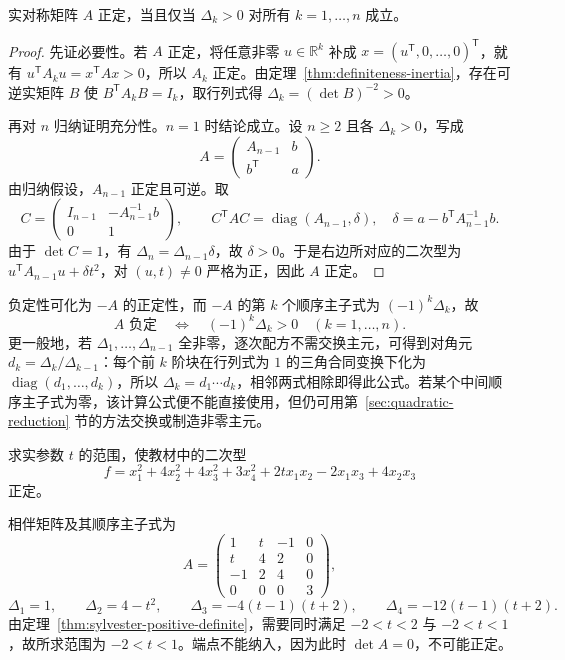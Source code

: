 \begin{theorem}[Sylvester 判据]
\label{thm:sylvester-positive-definite}
实对称矩阵 $A$ 正定，当且仅当 $\Delta_k>0$ 对所有 $k=1,\ldots,n$ 成立。
\end{theorem}
\begin{proof}
先证必要性。若 $A$ 正定，将任意非零 $u\in\mathbb R^k$ 补成 $x=(u^{\mathsf T},0,\ldots,0)^{\mathsf T}$，就有 $u^{\mathsf T}A_ku=x^{\mathsf T}Ax>0$，所以 $A_k$ 正定。由定理~\ref{thm:definiteness-inertia}，存在可逆实矩阵 $B$ 使 $B^{\mathsf T}A_kB=I_k$，取行列式得 $\Delta_k=(\det B)^{-2}>0$。

再对 $n$ 归纳证明充分性。$n=1$ 时结论成立。设 $n\geq2$ 且各 $\Delta_k>0$，写成
\[
    A=\begin{pmatrix}A_{n-1}&b\\b^{\mathsf T}&a\end{pmatrix}.
\]
由归纳假设，$A_{n-1}$ 正定且可逆。取
\[
    C=\begin{pmatrix}I_{n-1}&-A_{n-1}^{-1}b\\0&1\end{pmatrix},
    \qquad
    C^{\mathsf T}AC
     =\operatorname{diag}(A_{n-1},\delta),
    \quad \delta=a-b^{\mathsf T}A_{n-1}^{-1}b.
\]
由于 $\det C=1$，有 $\Delta_n=\Delta_{n-1}\delta$，故 $\delta>0$。于是右边所对应的二次型为 $u^{\mathsf T}A_{n-1}u+\delta t^2$，对 $(u,t)\ne0$ 严格为正，因此 $A$ 正定。
\end{proof}

负定性可化为 $-A$ 的正定性，而 $-A$ 的第 $k$ 个顺序主子式为 $(-1)^k\Delta_k$，故
\begin{equation}
\label{eq:negative-definite-leading-minors}
    A\text{ 负定}\quad\Longleftrightarrow\quad
    (-1)^k\Delta_k>0\quad(k=1,\ldots,n).
\end{equation}
更一般地，若 $\Delta_1,\ldots,\Delta_{n-1}$ 全非零，逐次配方不需交换主元，可得到对角元 $d_k=\Delta_k/\Delta_{k-1}$：每个前 $k$ 阶块在行列式为 $1$ 的三角合同变换下化为 $\operatorname{diag}(d_1,\ldots,d_k)$，所以 $\Delta_k=d_1\cdots d_k$，相邻两式相除即得此公式。若某个中间顺序主子式为零，该计算公式便不能直接使用，但仍可用第~\ref{sec:quadratic-reduction} 节的方法交换或制造非零主元。

\begin{example}
\label{ex:positive-definite-parameter}
求实参数 $t$ 的范围，使教材中的二次型
\[
    f=x_1^2+4x_2^2+4x_3^2+3x_4^2
      +2tx_1x_2-2x_1x_3+4x_2x_3
\]
正定。
\end{example}
\begin{solve}
相伴矩阵及其顺序主子式为
\[
    A=\begin{pmatrix}
        1&t&-1&0\\t&4&2&0\\-1&2&4&0\\0&0&0&3
    \end{pmatrix},
\]
\[
    \Delta_1=1,\qquad \Delta_2=4-t^2,\qquad
    \Delta_3=-4(t-1)(t+2),\qquad
    \Delta_4=-12(t-1)(t+2).
\]
由定理~\ref{thm:sylvester-positive-definite}，需要同时满足 $-2<t<2$ 与 $-2<t<1$，故所求范围为 $-2<t<1$。端点不能纳入，因为此时 $\det A=0$，不可能正定。
\end{solve}

